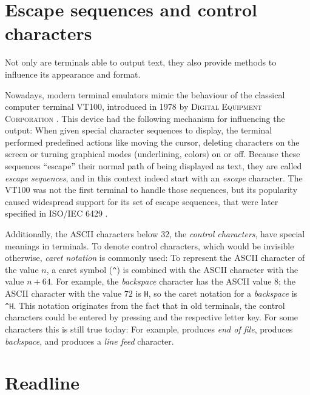 \documentclass[paper=a4,abstract=on,cleardoublepage=empty,numbers=noenddot,toc=bib,12pt,appendixprefix=true]{scrreprt}
\newcommand{\escape}[1]{\textasciicircum #1}
\begin{document}
\section{Escape sequences and control characters}

Not only are terminals able to output text, they also provide methods to influence its appearance and format.

Nowadays, modern terminal emulators mimic the behaviour of the classical computer terminal \textsc{VT100}, introduced in 1978 by \textsc{Digital Equipment Corporation} \cite{upt02}. This device had the following mechanism for influencing the output: When given special character sequences to display, the terminal performed predefined actions like moving the cursor, deleting characters on the screen or turning graphical modes (underlining, colors) on or off. Because these sequences “escape” their normal path of being displayed as text, they are called \emph{escape sequences}, and in this context indeed start with an \emph{escape} character. The \textsc{VT100} was not the first terminal to handle those sequences, but its popularity caused widespread support for its set of escape sequences, that were later specified in \textsc{ISO}/\textsc{IEC} 6429 \cite{iso6429}.

Additionally, the \textsc{ASCII} characters below 32, the \emph{control characters}, have special meanings in terminals.
To denote control characters, which would be invisible otherwise, \emph{caret notation} is commonly used: To represent the \textsc{ASCII} character of the value $n$, a caret symbol (\texttt{\textasciicircum}) is combined with the \textsc{ASCII} character with the value $n+64$. For example, the \emph{backspace} character has the \textsc{ASCII} value $8$; the \textsc{ASCII} character with the value $72$ is \texttt{H}, so the caret notation for a \emph{backspace} is \texttt{\escape{H}}. This notation originates from the fact that in old terminals, the control characters could be entered by pressing \keys{\ctrl} and the respective letter key. For some characters this is still true today: For example,  produces \emph{end of file},  produces \emph{backspace}, and  produces a \emph{line feed} character.

\section{Readline}
\end{document}
